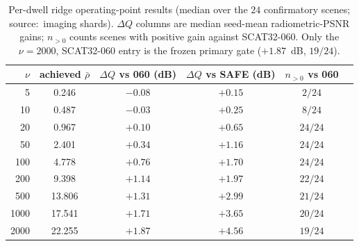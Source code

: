 \documentclass[10pt]{article}
\newcommand{\rhobar}{\bar{\rho}}
\begin{document}
\begin{table}[t]
\centering
\caption{Per-dwell ridge operating-point results (median over the $24$
confirmatory scenes; source:\ imaging shards). $\Delta Q$ columns are median
seed-mean radiometric-PSNR gains; $n_{>0}$ counts scenes with positive gain
against \textsc{SCAT32-060}. Only the $\nu = 2000$, \textsc{SCAT32-060} entry
is the frozen primary gate ($+1.87$~dB, $19/24$).}
\label{tab:s-perdwell}
\footnotesize
\setlength{\tabcolsep}{5pt}
\begin{tabular}{@{}rccccc@{}}
\hline
$\nu$ & achieved $\rhobar$ & $\Delta Q$ vs 060 (dB) &
$\Delta Q$ vs SAFE (dB) & $n_{>0}$ vs 060 \\
\hline
5    & 0.246  & $-0.08$ & $+0.15$ & $2/24$  \\
10   & 0.487  & $-0.03$ & $+0.25$ & $8/24$  \\
20   & 0.967  & $+0.10$ & $+0.65$ & $24/24$ \\
50   & 2.401  & $+0.34$ & $+1.16$ & $24/24$ \\
100  & 4.778  & $+0.76$ & $+1.70$ & $24/24$ \\
200  & 9.398  & $+1.14$ & $+1.97$ & $22/24$ \\
500  & 13.806 & $+1.31$ & $+2.99$ & $21/24$ \\
1000 & 17.541 & $+1.71$ & $+3.65$ & $20/24$ \\
2000 & 22.255 & $+1.87$ & $+4.56$ & $19/24$ \\
\hline
\end{tabular}
\end{table}
\end{document}
